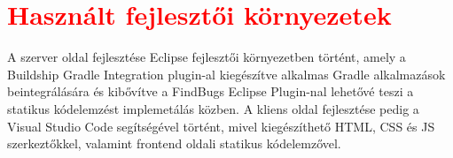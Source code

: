 \section{\textcolor{red}{Használt fejlesztői környezetek}}
\label{subsec:fejleszoiKornyezet}

A szerver oldal fejlesztése Eclipse \cite{Eclipse} fejlesztői környezetben történt, amely a Buildship Gradle Integration plugin-al \cite{GradlePlugin} kiegészítve alkalmas Gradle alkalmazások beintegrálására és kibővítve a FindBugs Eclipse Plugin-nal\cite{FindBugsEclipsePlugin} lehetővé teszi a statikus kódelemzést implemetálás közben. A kliens oldal fejlesztése pedig a Visual Studio Code \cite{VSCode} segítségével történt, mivel kiegészíthető HTML, CSS és JS szerkeztőkkel, valamint frontend oldali statikus kódelemzővel. 

